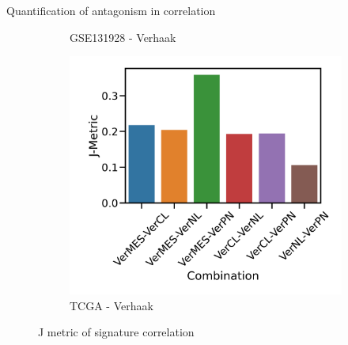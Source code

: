 \documentclass[aspectratio=169,9pt]{beamer}
\begin{document}
\begin{frame}{Quantification of antagonism in correlation}
\begin{adjustwidth}{-5cm}{-5cm}
\begin{figure}
\begin{subfigure}[c]{0.27\textwidth}
                    \caption{GSE131928 - Verhaak}
                \end{subfigure}
                \begin{subfigure}[c]{0.27\textwidth}
                    \centering
                    \includegraphics[width=\textwidth]{TCGA_Consistency_Ver}
                    \caption{TCGA - Verhaak}
                \end{subfigure}
            \pause[2]\caption{J metric of signature correlation}
            \end{figure}
        \end{adjustwidth}
    \end{frame}
\end{document}
